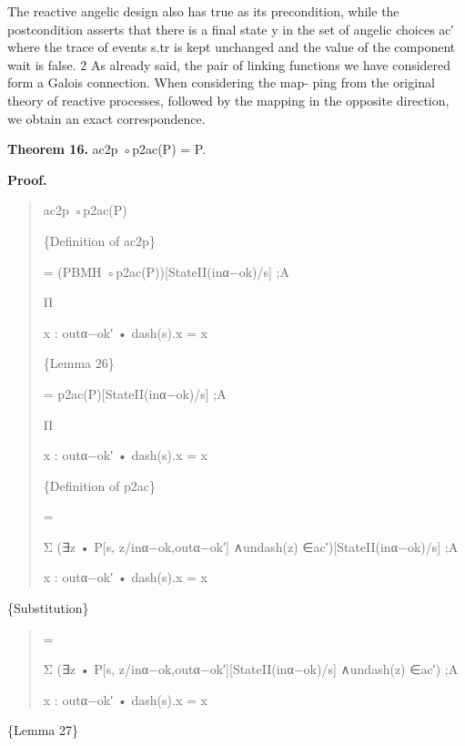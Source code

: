 \documentclass[11pt]{article}
\begin{document}
The reactive angelic design also has true as its precondition, while the postcondition asserts that there is a final state y in the set of angelic choices ac′ where the trace of events s.tr is kept unchanged and the value of the component wait is false. 2 As already said, the pair of linking functions we have considered form a Galois connection. When considering the map- ping from the original theory of reactive processes, followed by the mapping in the opposite direction, we obtain an exact correspondence.

\noindent\textbf{Theorem 16.} ac2p ◦p2ac(P) = P.


\noindent\textbf{Proof.}


\begin{quote}\small\raggedright
ac2p ◦p2ac(P)
\par
\{Definition of ac2p\}
\par
= (PBMH ◦p2ac(P))[StateII(inα−ok)/s] ;A
\par
Π
\par
x : outα−ok′ • dash(s).x = x
\par
\{Lemma 26\}
\par
= p2ac(P)[StateII(inα−ok)/s] ;A
\par
Π
\par
x : outα−ok′ • dash(s).x = x
\par
\{Definition of p2ac\}
\par
=
\par
Σ (∃z • P[s, z/inα−ok,outα−ok′] ∧undash(z) ∈ac′)[StateII(inα−ok)/s] ;A
\par
x : outα−ok′ • dash(s).x = x
\end{quote}

\{Substitution\}

\begin{quote}\small\raggedright
=
\par
Σ (∃z • P[s, z/inα−ok,outα−ok′][StateII(inα−ok)/s] ∧undash(z) ∈ac′) ;A
\par
x : outα−ok′ • dash(s).x = x
\end{quote}

\{Lemma 27\}
\end{document}
